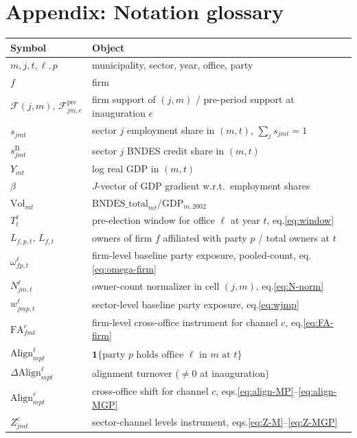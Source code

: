 \documentclass{article}
\newcommand{\Align}{\mathrm{Align}}
\newcommand{\FA}{\mathrm{FA}}
\newcommand{\Vol}{\mathrm{Vol}}
\newcommand{\ind}{\mathbf{1}}
\newcommand{\cF}{\mathcal{F}}
\theoremstyle{plain}
\theoremstyle{definition}
\theoremstyle{remark}
\begin{document}
\appendix
\section*{Appendix: Notation glossary}

\begin{center}
\renewcommand{\arraystretch}{1.2}
\begin{tabular}{ll}
\toprule
Symbol & Object \\
\midrule
$m,j,t,\ell,p$ & municipality, sector, year, office, party \\
$f$ & firm \\
$\cF(j,m),\,\cF^{\mathrm{pre}}_{jm,e}$ & firm support of $(j,m)$ / pre-period support at inauguration $e$ \\
$s_{jmt}$ & sector $j$ employment share in $(m,t)$, $\sum_j s_{jmt}=1$ \\
$s^{\mathrm{B}}_{jmt}$ & sector $j$ BNDES credit share in $(m,t)$ \\
$Y_{mt}$ & log real GDP in $(m,t)$ \\
$\beta$ & $J$-vector of GDP gradient w.r.t.\ employment shares \\
$\Vol_{mt}$ & $\mathrm{BNDES\_total}_{mt}/\mathrm{GDP}_{m,2002}$ \\
$T^{\ell}_{t}$ & pre-election window for office $\ell$ at year $t$, eq.\eqref{eq:window} \\
$L_{f,p,t},\,L_{f,t}$ & owners of firm $f$ affiliated with party $p$ / total owners at $t$ \\
$\omega^{\ell}_{fp,t}$ & firm-level baseline party exposure, pooled-count, eq.\eqref{eq:omega-firm} \\
$N^{\ell}_{jm,t}$ & owner-count normalizer in cell $(j,m)$, eq.\eqref{eq:N-norm} \\
$w^{\ell}_{jmp,t}$ & sector-level baseline party exposure, eq.\eqref{eq:wjmp} \\
$\FA^{c}_{fmt}$ & firm-level cross-office instrument for channel $c$, eq.\eqref{eq:FA-firm} \\
$\Align^{\ell}_{mpt}$ & $\ind\{\text{party } p \text{ holds office } \ell \text{ in } m \text{ at } t\}$ \\
$\Delta\Align^{\ell}_{mpt}$ & alignment turnover ($\neq 0$ at inauguration) \\
$\Align^{c}_{mpt}$ & cross-office shift for channel $c$, eqs.\eqref{eq:align-MP}--\eqref{eq:align-MGP} \\
$Z^{c}_{jmt}$ & sector-channel levels instrument, eqs.\eqref{eq:Z-M}--\eqref{eq:Z-MGP} \\

\end{tabular}
\end{center}
\end{document}
